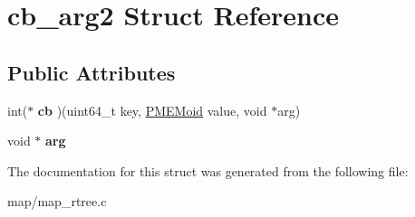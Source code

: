 \hypertarget{structcb__arg2}{}\section{cb\+\_\+arg2 Struct Reference}
\label{structcb__arg2}
\subsection*{Public Attributes}
\begin{DoxyCompactItemize}
\item 
\mbox{\label{structcb__arg2_a33ba5dab65addea38de54263bbf24f04}} 
int($\ast$ {\bfseries cb} )(uint64\+\_\+t key, \hyperlink{structpmemoid}{P\+M\+E\+Moid} value, void $\ast$arg)
\item 
\mbox{\label{structcb__arg2_a64dc721d857d7e8272620a348f79911e}} 
void $\ast$ {\bfseries arg}
\end{DoxyCompactItemize}


The documentation for this struct was generated from the following file\+:\begin{DoxyCompactItemize}
\item 
map/map\+\_\+rtree.\+c\end{DoxyCompactItemize}
